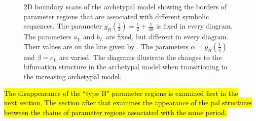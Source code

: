 \begin{figure}
{		\label{fig:add.change.regions.3}
	}
	\caption[Changes to the bifurcation structures of the archetypal model during its transition to the increasing archetypal model]{
		2D boundary scans of the archetypal model showing the borders of parameter regions that are associated with different symbolic sequences.
		The parameter $g_R\left(\frac{1}{2}\right) = \frac{1}{2} + \frac{1}{40}$ is fixed in every diagram.
		The parameters $a_L$ and $b_L$ are fixed, but different in every diagram.
		Their values are on the line given by .
		The parameters $\alpha = g_R\left(\frac{1}{4}\right)$ and $\beta = c_L$ are varied.
		The diagrams illustrate the changes to the bifurcation structure in the archetypal model when transitioning to the increasing archetypal model.
	}
	\label{fig:add.change.regions}
\end{figure}


\hl{
	The disappearance of the ``type B'' parameter regions is examined first in the next section.
	The section after that examines the appearance of the \gls{pal} structures between the chains of parameter regions associated with the same period.
}




